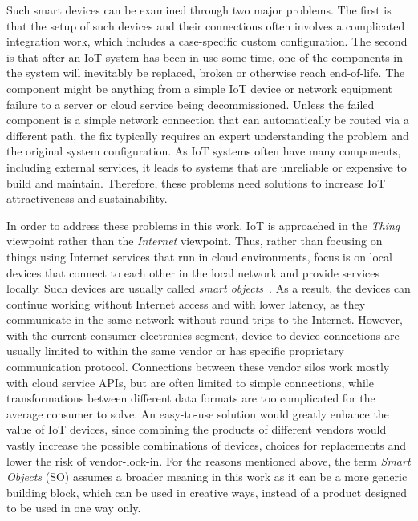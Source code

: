Such smart devices can be examined through two major problems. The first is that the setup of such devices and their connections often involves a complicated integration work, which includes a case-specific custom configuration. The second is that after an IoT system has been in use some time, one of the components in the system will inevitably be replaced, broken or otherwise reach end-of-life. The component might be anything from a simple IoT device or network equipment failure to a server or cloud service being decommissioned. Unless the failed component is a simple network connection that can automatically be routed via a different path, the fix typically requires an expert understanding the problem and the original system configuration. As IoT systems often have many components, including external services, it leads to systems that are unreliable or expensive to build and maintain. Therefore, these problems need solutions to increase IoT attractiveness and sustainability.

In order to address these problems in this work, IoT is approached in the \emph{Thing} viewpoint rather than the \emph{Internet} viewpoint. Thus, rather than focusing on things using Internet services that run in cloud environments, focus is on local devices that connect to each other in the local network and provide services locally. Such devices are usually called \emph{smart objects}~\cite{Smart_objects_as_building_blocks_for_the_Internet_of_things}. As a result, the devices can continue working without Internet access and with lower latency, as they communicate in the same network without round-trips to the Internet. However, with the current consumer electronics segment, device-to-device connections are usually limited to within the same vendor or has specific proprietary communication protocol. Connections between these vendor silos work mostly with cloud service APIs, but are often limited to simple connections, while transformations between different data formats are too complicated for the average consumer to solve. An easy-to-use solution would greatly enhance the value of IoT devices, since combining the products of different vendors would vastly increase the possible combinations of devices, choices for replacements and lower the risk of vendor-lock-in. For the reasons mentioned above, the term \emph{Smart Objects} (SO) assumes a broader meaning in this work as it can be a more generic building block, which can be used in creative ways, instead of a product designed to be used in one way only.




